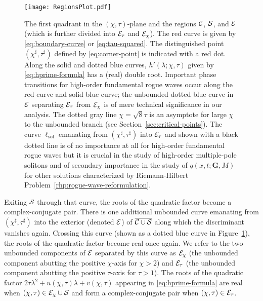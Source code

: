 \begin{figure}[h]
\begin{center}
\texttt{[image: RegionsPlot.pdf]}
\end{center}
\caption{The first quadrant in the $(\chi,\tau)$-plane and the regions $\mathcal{C}$, $\mathcal{S}$, and $\mathcal{E}$ (which is further divided into $\mathcal{E}_\tau$ and $\mathcal{E}_\chi$).  The red curve is given by \eqref{eq:boundary-curve} or \eqref{eq:tau-squared}.  The distinguished point $(\chi^\sharp,\tau^\sharp)$ defined by \eqref{eq:corner-point} is indicated with a red dot.  Along the solid and dotted blue curves, $h'(\lambda;\chi,\tau)$ given by \eqref{eq:hprime-formula} has a (real) double root.  Important phase transitions for high-order fundamental rogue waves occur along the red curve and solid blue curve; the unbounded dotted blue curve in $\mathcal{E}$ separating $\mathcal{E}_\tau$ from $\mathcal{E}_\chi$ is of mere technical significance in our analysis.  The dotted gray line $\chi=\sqrt{8}\tau$ is an asymptote for large $\chi$ to the unbounded branch (see Section~\ref{sec:critical-points}).  The curve $\ell_\mathrm{sol}$ emanating from $(\chi^\sharp,\tau^\sharp)$ into $\mathcal{E}_\tau$ and shown with a black dotted line is of no importance at all for high-order fundamental rogue waves but it is crucial in the study of high-order multiple-pole solitons and of secondary importance in the study of $q(x,t;\mathbf{G},M)$ for other solutions characterized by Riemann-Hilbert Problem~\ref{rhp:rogue-wave-reformulation}.}
\label{fig:RegionsPlot}
\end{figure}

Exiting $\mathcal{S}$ through that curve, the roots of the quadratic factor become a complex-conjugate pair.  There is one additional unbounded curve emanating from $(\chi^\sharp,\tau^\sharp)$ into the exterior (denoted $\mathcal{E}$) of $\overline{\mathcal{C}\cup\mathcal{S}}$ along which the discriminant vanishes again.  Crossing this curve (shown as a dotted blue curve in Figure~\ref{fig:RegionsPlot}), the roots of the quadratic factor become real once again.  We refer to the two unbounded components of $\mathcal{E}$ separated by this curve as $\mathcal{E}_\chi$ (the unbounded component abutting the positive $\chi$-axis for $\chi>2$) and $\mathcal{E}_\tau$ (the unbounded component abutting the positive $\tau$-axis for $\tau>1$).
The roots of the quadratic factor $2\tau\lambda^2+u(\chi,\tau)\lambda+v(\chi,\tau)$ appearing in \eqref{eq:hprime-formula} are real when $(\chi,\tau)\in \mathcal{E}_\chi\cup \mathcal{S}$ and form a complex-conjugate pair when $(\chi,\tau)\in \mathcal{E}_\tau$.

